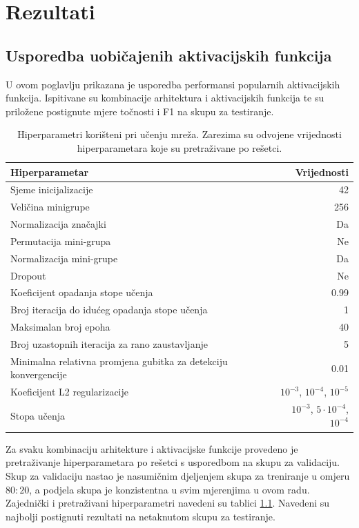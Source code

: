 \documentclass[times, utf8, numeric, diplomski]{fer}
\begin{document}
\chapter{Rezultati}
\label{sec:rezultati}

\section{Usporedba uobičajenih aktivacijskih funkcija}
U ovom poglavlju prikazana je usporedba performansi popularnih aktivacijskih funkcija. Ispitivane su kombinacije arhitektura i aktivacijskih funkcija te su priložene postignute mjere točnosti i F1 na skupu za testiranje.

\begin{table}[H]
\centering
\begin{tabular}{lr}
Hiperparametar & Vrijednosti \\
\hline
Sjeme inicijalizacije & 42 \\
Veličina minigrupe & 256 \\
Normalizacija značajki & Da \\
Permutacija mini-grupa & Ne \\
Normalizacija mini-grupe & Da \\
Dropout & Ne \\
Koeficijent opadanja stope učenja & 0.99 \\
Broj iteracija do idućeg opadanja stope učenja & 1 \\
Maksimalan broj epoha & 40 \\
Broj uzastopnih iteracija za rano zaustavljanje & 5 \\
Minimalna relativna promjena gubitka za detekciju konvergencije & 0.01 \\
\hline
Koeficijent L2 regularizacije & $10^{-3}$, $10^{-4}$, $10^{-5}$ \\
Stopa učenja & $10^{-3}$, $5 \cdot 10^{-4}$, $10^{-4}$
\end{tabular}
\caption{Hiperparametri korišteni pri učenju mreža. Zarezima su odvojene vrijednosti hiperparametara koje su pretraživane po rešetci.}
\label{tab:hp_common}
\end{table}

Za svaku kombinaciju arhitekture i aktivacijske funkcije provedeno je pretraživanje hiperparametara po rešetci s usporedbom na skupu za validaciju. Skup za validaciju nastao je nasumičnim djeljenjem skupa za treniranje u omjeru $80:20$, a podjela skupa je konzistentna u svim mjerenjima u ovom radu. Zajednički i pretraživani hiperparametri navedeni su tablici \ref{tab:hp_common}. Navedeni su najbolji postignuti rezultati na netaknutom skupu za testiranje.
\end{document}

